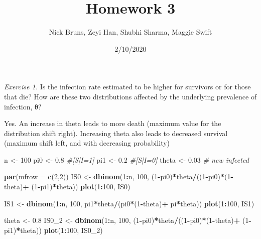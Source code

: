 \documentclass[]{article}
\title{Homework 3}
\author{Nick Bruns, Zeyi Han, Shubhi Sharma, Maggie Swift}
\date{2/10/2020}
\newenvironment{Shaded}{\begin{snugshade}}{\end{snugshade}}
\newcommand{\CommentTok}[1]{\textcolor[rgb]{0.56,0.35,0.01}{\textit{#1}}}
\newcommand{\DataTypeTok}[1]{\textcolor[rgb]{0.13,0.29,0.53}{#1}}
\newcommand{\DecValTok}[1]{\textcolor[rgb]{0.00,0.00,0.81}{#1}}
\newcommand{\FloatTok}[1]{\textcolor[rgb]{0.00,0.00,0.81}{#1}}
\newcommand{\KeywordTok}[1]{\textcolor[rgb]{0.13,0.29,0.53}{\textbf{#1}}}
\newcommand{\NormalTok}[1]{#1}
\newcommand{\OperatorTok}[1]{\textcolor[rgb]{0.81,0.36,0.00}{\textbf{#1}}}
\newcommand{\StringTok}[1]{\textcolor[rgb]{0.31,0.60,0.02}{#1}}
\begin{document}
\maketitle

\emph{Exercise 1.} Is the infection rate estimated to be higher for
survivors or for those that die? How are these two distributions
affected by the underlying prevalence of infection, θ?

Yes. An increase in theta leads to more death (maximum value for the
distribution shift right). Increasing theta also leads to decreased
survival (maximum shift left, and with decreasing probability)

\begin{Shaded}
\begin{Highlighting}[]
\NormalTok{n <-}\StringTok{ }\DecValTok{100}
\NormalTok{pi0 <-}\StringTok{ }\FloatTok{0.8}  \CommentTok{#[S|I=1]}
\NormalTok{pi1 <-}\StringTok{ }\FloatTok{0.2}   \CommentTok{#[S|I=0]}
\NormalTok{theta <-}\StringTok{ }\FloatTok{0.03}   \CommentTok{# new infected}
 
\KeywordTok{par}\NormalTok{(}\DataTypeTok{mfrow =} \KeywordTok{c}\NormalTok{(}\DecValTok{2}\NormalTok{,}\DecValTok{2}\NormalTok{))}
\NormalTok{IS0 <-}\StringTok{ }\KeywordTok{dbinom}\NormalTok{(}\DecValTok{1}\OperatorTok{:}\NormalTok{n, }\DecValTok{100}\NormalTok{, (}\DecValTok{1}\OperatorTok{-}\NormalTok{pi0)}\OperatorTok{*}\NormalTok{theta}\OperatorTok{/}\NormalTok{((}\DecValTok{1}\OperatorTok{-}\NormalTok{pi0)}\OperatorTok{*}\NormalTok{(}\DecValTok{1}\OperatorTok{-}\NormalTok{theta)}\OperatorTok{+}\StringTok{ }\NormalTok{(}\DecValTok{1}\OperatorTok{-}\NormalTok{pi1)}\OperatorTok{*}\NormalTok{theta))}
\KeywordTok{plot}\NormalTok{(}\DecValTok{1}\OperatorTok{:}\DecValTok{100}\NormalTok{, IS0)}
 
\NormalTok{IS1 <-}\StringTok{ }\KeywordTok{dbinom}\NormalTok{(}\DecValTok{1}\OperatorTok{:}\NormalTok{n, }\DecValTok{100}\NormalTok{, pi1}\OperatorTok{*}\NormalTok{theta}\OperatorTok{/}\NormalTok{(pi0}\OperatorTok{*}\NormalTok{(}\DecValTok{1}\OperatorTok{-}\NormalTok{theta)}\OperatorTok{+}\StringTok{ }\NormalTok{pi}\OperatorTok{*}\NormalTok{theta))}
\KeywordTok{plot}\NormalTok{(}\DecValTok{1}\OperatorTok{:}\DecValTok{100}\NormalTok{, IS1)}

\NormalTok{theta <-}\StringTok{ }\FloatTok{0.8}
\NormalTok{IS0_}\DecValTok{2}\NormalTok{ <-}\StringTok{ }\KeywordTok{dbinom}\NormalTok{(}\DecValTok{1}\OperatorTok{:}\NormalTok{n, }\DecValTok{100}\NormalTok{, (}\DecValTok{1}\OperatorTok{-}\NormalTok{pi0)}\OperatorTok{*}\NormalTok{theta}\OperatorTok{/}\NormalTok{((}\DecValTok{1}\OperatorTok{-}\NormalTok{pi0)}\OperatorTok{*}\NormalTok{(}\DecValTok{1}\OperatorTok{-}\NormalTok{theta)}\OperatorTok{+}\StringTok{ }\NormalTok{(}\DecValTok{1}\OperatorTok{-}\NormalTok{pi1)}\OperatorTok{*}\NormalTok{theta))}
\KeywordTok{plot}\NormalTok{(}\DecValTok{1}\OperatorTok{:}\DecValTok{100}\NormalTok{, IS0_}\DecValTok{2}\NormalTok{)}
 

\end{Highlighting}
\end{Shaded}
\end{document}

